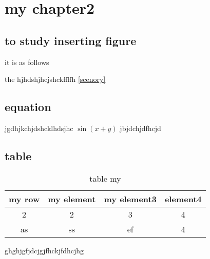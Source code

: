 \chapter{my chapter2}

\section{ to study inserting figure}

it is as follows







the hjhdshjhcjshckffffh \ref{scenory}

\section{equation}


jgdhjkchjdshcklhdsjhc $\sin(x+y)$ jbjdchjdfhcjd


%
%


\section{table}


\begin{table}
\centering
\caption{table my}
\begin{tabular}{|c|c|c|c|}
  \hline
  my row & my element & my element3 & element4 \\
  \hline
  2 & 2 & 3 & 4 \\
  \hline
  as & ss & ef & 4\\
  \hline
\end{tabular}
\end{table}

ghghjgfjdcjgjfhckjfdhcjhg \cite{kilbas_srivastava_trujillo}
